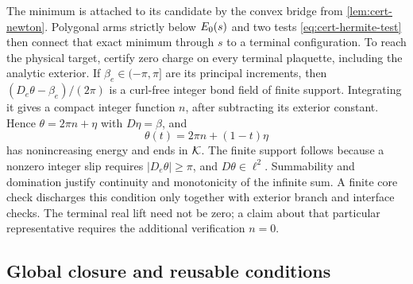 The minimum is attached to its candidate by the convex bridge from
\cref{lem:cert-newton}. Polygonal arms strictly below $E_0(s)$ and two
tests \eqref{eq:cert-hermite-test} then connect that exact minimum through
$s$ to a terminal configuration. To reach the physical target, certify
zero charge on every terminal plaquette, including the analytic
exterior. If $\beta_e\in(-\pi,\pi]$ are its principal increments, then
$(D_e\theta-\beta_e)/(2\pi)$ is a curl-free integer bond field of finite
support. Integrating it gives a compact integer function $n$, after
subtracting its exterior constant. Hence
$\theta=2\pi n+\eta$ with $D\eta=\beta$, and
\begin{equation}\label{eq:cert-terminal-path}
 \theta(t)=2\pi n+(1-t)\eta
\end{equation}
has nonincreasing energy and ends in $\mathcal K$. The finite support follows
because a nonzero integer slip requires $|D_e\theta|\ge\pi$, and
$D\theta\in\ell^2$. Summability and domination justify continuity and
monotonicity of the infinite sum. A finite core check discharges this
condition only together with exterior branch and interface checks.
The terminal real lift need not be zero; a claim about that particular
representative requires the additional verification $n=0$.

\subsection{Global closure and reusable conditions}

